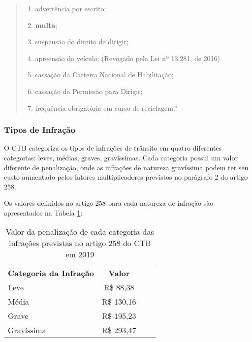     \begin{quote}
            \renewcommand{\theenumi}{\Roman{enumi}}%
            \begin{enumerate}
                \item advertência por escrito;
                \item \textbf{multa};
                \item suspensão do direito de dirigir;
                \item apreensão do veículo; (Revogado pela Lei nº 13.281, de 2016)
                \item cassação da Carteira Nacional de Habilitação;
                \item cassação da Permissão para Dirigir;
                \item frequência obrigatória em curso de reciclagem.''
             \end{enumerate}
    \end{quote}
    

    \subsubsection{Tipos de Infração}

    O CTB categoriza os tipos de infrações de trânsito em quatro diferentes categorias: leves, médias, graves, gravíssimas. Cada categoria possui um valor diferente de penalização, onde as infrações de natureza gravíssima podem ter seu custo aumentado pelos fatores multiplicadores previstos no parágrafo 2 do artigo 258.
    
    Os valores definidos no artigo 258 para cada natureza de infração são apresentados na Tabela \ref{tabela_precos_infracoes_categorias}:
    
    \begin{table}[H]
        \caption{Valor da penalização de cada categoria das infrações previstas no artigo 258 do CTB em 2019}
        \begin{tabular}{|l|c|ll}
        \cline{1-2}
        \multicolumn{1}{|c|}{\textbf{Categoria da Infração}} & \textbf{Valor} &  &  \\ \cline{1-2}
        Leve & R\$ 88,38 &  &  \\ \cline{1-2}
        Média & R\$ 130,16 &  &  \\ \cline{1-2}
        Grave & R\$ 195,23 &  &  \\ \cline{1-2}
        Gravíssima & R\$ 293,47 &  &  \\ \cline{1-2}
        \end{tabular}
        \label{tabela_precos_infracoes_categorias}
    \end{table}
    
